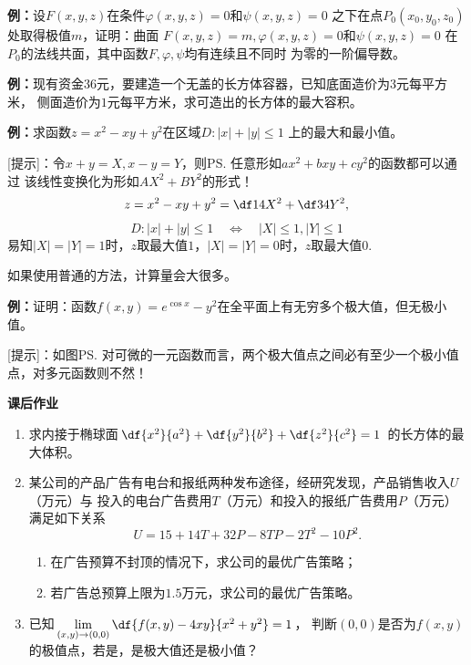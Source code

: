{\bf 例：}设$F(x,y,z)$在条件$\varphi(x,y,z)=0$和$\psi(x,y,z)=0$
之下在点$P_0(x_0,y_0,z_0)$处取得极值$m$，证明：曲面
$F(x,y,z)=m,\varphi(x,y,z)=0$和$\psi(x,y,z)=0$
在$P_0$的法线共面，其中函数$F,\varphi,\psi$均有连续且不同时
为零的一阶偏导数。

{\bf 例：}现有资金$36$元，要建造一个无盖的长方体容器，已知底面造价为$3$元每平方米，
侧面造价为$1$元每平方米，求可造出的长方体的最大容积。

{\bf 例：}求函数$z=x^2-xy+y^2$在区域$D:|x|+|y|\leq 1$
上的最大和最小值。

[提示]：令$x+y=X,x-y=Y$，则\ps{任意形如$ax^2+bxy+cy^2$的函数都可以通过
该线性变换化为形如$AX^2+BY^2$的形式！}
$$z=x^2-xy+y^2=\df14X^2+\df34Y^2,$$
$$D:|x|+|y|\leq 1\quad\Leftrightarrow\quad |X|\leq1,|Y|\leq1$$
易知$|X|=|Y|=1$时，$z$取最大值$1$，$|X|=|Y|=0$时，$z$取最大值$0$.

如果使用普通的方法，计算量会大很多。

{\bf 例：}证明：函数$f(x,y)=e^{\cos x}-y^2$在全平面上有无穷多个极大值，但无极小值。

[提示]：如图\ps{对可微的一元函数而言，两个极大值点之间必有至少一个极小值点，对多元函数则不然！}
\begin{center}
\end{center}

\begin{ext}
	{\bf 课后作业}
	\begin{enumerate}
	  \item 求内接于椭球面$\df{x^2}{a^2}+\df{y^2}{b^2}+\df{z^2}{c^2}=1$
	  的长方体的最大体积。
	  \item 某公司的产品广告有电台和报纸两种发布途径，经研究发现，产品销售收入$U$（万元）与
	  投入的电台广告费用$T$（万元）和投入的报纸广告费用$P$（万元）满足如下关系
	  $$U=15+14T+32P-8TP-2T^2-10P^2.$$
	  \begin{enumerate}[(1)]
	    \item 在广告预算不封顶的情况下，求公司的最优广告策略；
	    \item 若广告总预算上限为$1.5$万元，求公司的最优广告策略。
	  \end{enumerate}
	  \item 已知$\lim\limits_{(x,y)\to(0,0)}\df{f(x,y)-4xy}{x^2+y^2}=1$，
	  判断$(0,0)$是否为$f(x,y)$的极值点，若是，是极大值还是极小值？
	\end{enumerate}
\end{ext}

